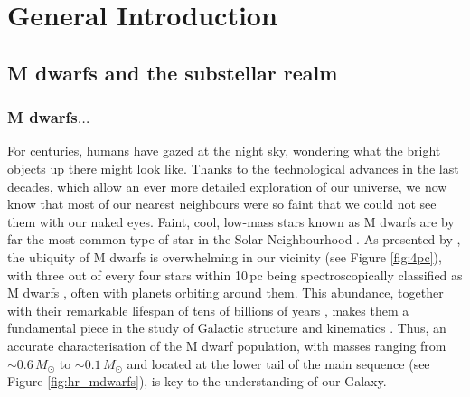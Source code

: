 

\chapter{General Introduction} \label{chp:general_intro}


\section{M dwarfs and the substellar realm} \label{chp:mdwarfs_intro}

\subsection{M dwarfs$\dots$}


For centuries, humans have gazed at the night sky, wondering what the bright objects up there might look like. Thanks to the technological advances in the last decades, which allow an ever more detailed exploration of our universe, we now know that most of our nearest neighbours were so faint that we could not see them with our naked eyes. Faint, cool, low-mass stars known as M dwarfs are by far the most common type of star in the Solar Neighbourhood \citep{henry1994,reid2004,bochanski2010,reyle2021,kirkpatrick2024}. As presented by \citet{reyle2021}, the ubiquity of M dwarfs is overwhelming in our vicinity (see Figure \ref{fig:4pc}), with three out of every four stars within 10\,pc being spectroscopically classified as M dwarfs \citep[see Table 2 in][]{henry2024}, often with planets orbiting around them. This abundance, together with their remarkable lifespan of tens of billions of years \citep{adams1997,laughlin1997}, makes them a fundamental piece in the study of Galactic structure and kinematics \citep{chabrier2003,chabrier2005,bochanski2007,caballero2008,ferguson2017,cortes2024}. Thus, an accurate characterisation of the M dwarf population, with masses ranging from $\sim0.6$\,$M_{\odot}$ to $\sim0.1$\,$M_{\odot}$ \citep{cifuentes_ucm} and located at the lower tail of the main sequence (see Figure \ref{fig:hr_mdwarfs}), is key to the understanding of our Galaxy.


